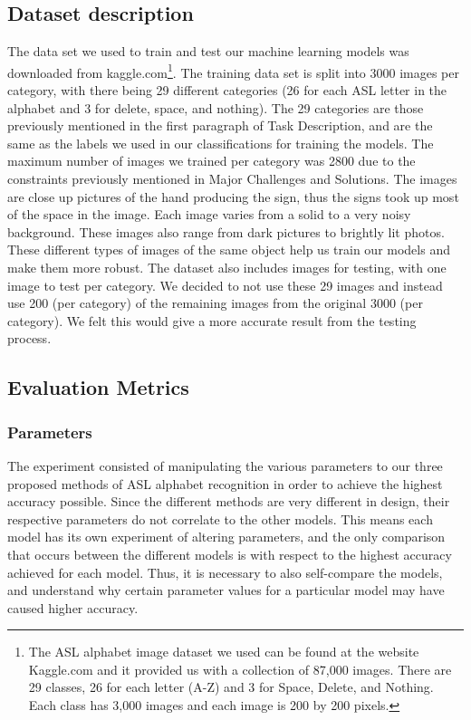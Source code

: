\documentclass[conference]{IEEEtran}
\begin{document}
\subsection{Dataset description}
The data set we used to train and test our machine learning models was downloaded from kaggle.com\footnote{The ASL alphabet image dataset we used can be found at the website Kaggle.com and it provided us with a collection of 87,000 images. There are 29 classes, 26 for each letter (A-Z) and 3 for Space, Delete, and Nothing. Each class has 3,000 images and each image is 200 by 200 pixels.}. The training data set is split into 3000 images per category, with there being 29 different categories (26 for each ASL letter in the alphabet and 3 for delete, space, and nothing). The 29 categories are those previously mentioned in the first paragraph of Task Description, and are the same as the labels we used in our classifications for training the models. The maximum number of images we trained per category was 2800 due to the constraints previously mentioned in Major Challenges and Solutions. The images are close up pictures of the hand producing the sign, thus the signs took up most of the space in the image. Each image varies from a solid to a very noisy background. These images also range from dark pictures to brightly lit photos. These different types of images of the same object help us train our models and make them more robust. The dataset also includes images for testing, with one image to test per category. We decided to not use these 29 images and instead use 200 (per category) of the remaining images from the original 3000 (per category). We felt this would give a more accurate result from the testing process.
\subsection{Evaluation Metrics}
\subsubsection{Parameters}
The experiment consisted of manipulating the various parameters to our three proposed methods of ASL alphabet recognition in order to achieve the highest accuracy possible. Since the different methods are very different in design, their respective parameters do not correlate to the other models. This means each model has its own experiment of altering parameters, and the only comparison that occurs between the different models is with respect to the highest accuracy achieved for each model. Thus, it is necessary to also self-compare the models, and understand why certain parameter values for a particular model may have caused higher accuracy. 
\end{document}
